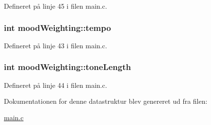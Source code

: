 Defineret på linje 45 i filen main.\+c.

\hypertarget{structmood_weighting_a9b2180e8a4aab163ae48d0a66269a840}{
\subsubsection[{tempo}]{\setlength{\rightskip}{0pt plus 5cm}int mood\+Weighting\+::tempo}}\label{structmood_weighting_a9b2180e8a4aab163ae48d0a66269a840}


Defineret på linje 43 i filen main.\+c.

\hypertarget{structmood_weighting_ab9e917ae02761f06d11c59645a45536d}{
\subsubsection[{tone\+Length}]{\setlength{\rightskip}{0pt plus 5cm}int mood\+Weighting\+::tone\+Length}}\label{structmood_weighting_ab9e917ae02761f06d11c59645a45536d}


Defineret på linje 44 i filen main.\+c.



Dokumentationen for denne datastruktur blev genereret ud fra filen\+:\begin{DoxyCompactItemize}
\item 
\hyperlink{main_8c}{main.\+c}\end{DoxyCompactItemize}
